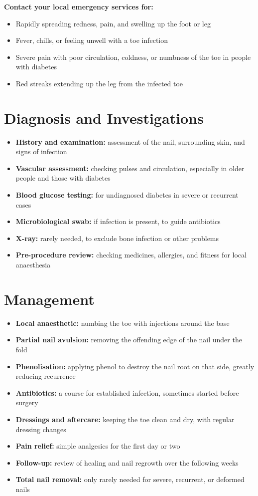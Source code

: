 \textbf{Contact your local emergency services for:}
\begin{itemize}
    \item Rapidly spreading redness, pain, and swelling up the foot or leg
    \item Fever, chills, or feeling unwell with a toe infection
    \item Severe pain with poor circulation, coldness, or numbness of the toe in people with diabetes
    \item Red streaks extending up the leg from the infected toe
\end{itemize}

\section*{Diagnosis and Investigations}
\begin{itemize}
    \item \textbf{History and examination:} assessment of the nail, surrounding skin, and signs of infection
    \item \textbf{Vascular assessment:} checking pulses and circulation, especially in older people and those with diabetes
    \item \textbf{Blood glucose testing:} for undiagnosed diabetes in severe or recurrent cases
    \item \textbf{Microbiological swab:} if infection is present, to guide antibiotics
    \item \textbf{X-ray:} rarely needed, to exclude bone infection or other problems
    \item \textbf{Pre-procedure review:} checking medicines, allergies, and fitness for local anaesthesia
\end{itemize}

\section*{Management}
\begin{itemize}
    \item \textbf{Local anaesthetic:} numbing the toe with injections around the base
    \item \textbf{Partial nail avulsion:} removing the offending edge of the nail under the fold
    \item \textbf{Phenolisation:} applying phenol to destroy the nail root on that side, greatly reducing recurrence
    \item \textbf{Antibiotics:} a course for established infection, sometimes started before surgery
    \item \textbf{Dressings and aftercare:} keeping the toe clean and dry, with regular dressing changes
    \item \textbf{Pain relief:} simple analgesics for the first day or two
    \item \textbf{Follow-up:} review of healing and nail regrowth over the following weeks
    \item \textbf{Total nail removal:} only rarely needed for severe, recurrent, or deformed nails
\end{itemize}

